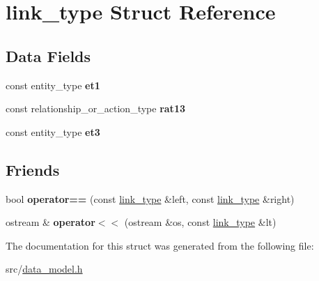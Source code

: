 \hypertarget{structlink__type}{}\section{link\+\_\+type Struct Reference}
\label{structlink__type}
\subsection*{Data Fields}
\begin{DoxyCompactItemize}
\item 
const entity\+\_\+type {\bfseries et1}\hypertarget{structlink__type_aa1e1406306efb10b6c71e6425df2405d}{}\label{structlink__type_aa1e1406306efb10b6c71e6425df2405d}

\item 
const relationship\+\_\+or\+\_\+action\+\_\+type {\bfseries rat13}\hypertarget{structlink__type_ac178aea7e3b72e3579ea365625291c4a}{}\label{structlink__type_ac178aea7e3b72e3579ea365625291c4a}

\item 
const entity\+\_\+type {\bfseries et3}\hypertarget{structlink__type_a5d2db20b11fedaab93e193fce2e205a8}{}\label{structlink__type_a5d2db20b11fedaab93e193fce2e205a8}

\end{DoxyCompactItemize}
\subsection*{Friends}
\begin{DoxyCompactItemize}
\item 
bool {\bfseries operator==} (const \hyperlink{structlink__type}{link\+\_\+type} \&left, const \hyperlink{structlink__type}{link\+\_\+type} \&right)\hypertarget{structlink__type_ae75460e218908d70af1163248317096e}{}\label{structlink__type_ae75460e218908d70af1163248317096e}

\item 
ostream \& {\bfseries operator$<$$<$} (ostream \&os, const \hyperlink{structlink__type}{link\+\_\+type} \&lt)\hypertarget{structlink__type_a3b1d9aca31b4d38961fafd8f10732bea}{}\label{structlink__type_a3b1d9aca31b4d38961fafd8f10732bea}

\end{DoxyCompactItemize}


The documentation for this struct was generated from the following file\+:\begin{DoxyCompactItemize}
\item 
src/\hyperlink{data__model_8h}{data\+\_\+model.\+h}\end{DoxyCompactItemize}
